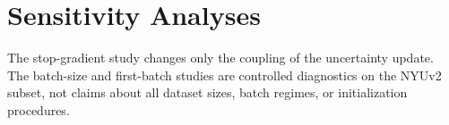 \section{Sensitivity Analyses}
\label{app:sensitivity}




The stop-gradient study changes only the coupling of the uncertainty update. The batch-size and
first-batch studies are controlled diagnostics on the NYUv2 subset, not claims about all dataset
sizes, batch regimes, or initialization procedures.
